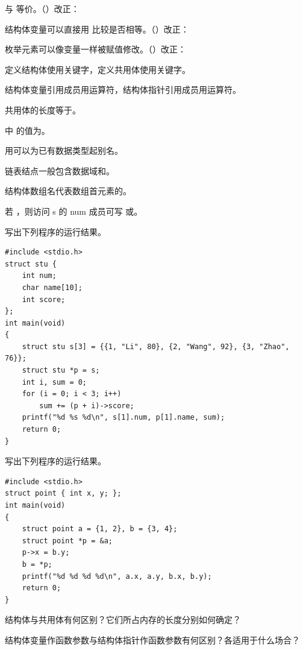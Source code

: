 \documentclass[a4paper,11pt]{article}
\begin{document}
\q {} 与  等价。\quad（\quad）\quad 改正：\fixblank

\q 结构体变量可以直接用 \code{==} 比较是否相等。\quad（\quad）\quad 改正：\fixblank

\q 枚举元素可以像变量一样被赋值修改。\quad（\quad）\quad 改正：\fixblank

\q 定义结构体使用关键字\fillblanks[1.4cm]，定义共用体使用关键字\fillblanks[1.4cm]。

\q 结构体变量引用成员用\fillblanks[0.8cm]运算符，结构体指针引用成员用\fillblanks[1.2cm]运算符。

\q 共用体的长度等于\fillblanks[2.4cm]。

\q {} 中  的值为\fillblank{}。

\q 用\fillblanks[1.8cm]可以为已有数据类型起别名。

\q 链表结点一般包含数据域和\fillblanks[1.6cm]。

\q 结构体数组名代表数组首元素的\fillblanks[1.2cm]。

\q 若 ，则访问 s 的 num 成员可写  或\fillblanks[1.8cm]。

\q 写出下列程序的运行结果。
\begin{lstlisting}[language={[custom]C}]
#include <stdio.h>
struct stu {
    int num;
    char name[10];
    int score;
};
int main(void)
{
    struct stu s[3] = {{1, "Li", 80}, {2, "Wang", 92}, {3, "Zhao", 76}};
    struct stu *p = s;
    int i, sum = 0;
    for (i = 0; i < 3; i++)
        sum += (p + i)->score;
    printf("%d %s %d\n", s[1].num, p[1].name, sum);
    return 0;
}
\end{lstlisting}
\anslines{2.4cm}

\q 写出下列程序的运行结果。
\begin{lstlisting}[language={[custom]C}]
#include <stdio.h>
struct point { int x, y; };
int main(void)
{
    struct point a = {1, 2}, b = {3, 4};
    struct point *p = &a;
    p->x = b.y;
    b = *p;
    printf("%d %d %d %d\n", a.x, a.y, b.x, b.y);
    return 0;
}
\end{lstlisting}
\anslines{2.6cm}

\q 结构体与共用体有何区别？它们所占内存的长度分别如何确定？\anslines{3.2cm}

\q 结构体变量作函数参数与结构体指针作函数参数有何区别？各适用于什么场合？\anslines{3.2cm}
\end{document}
